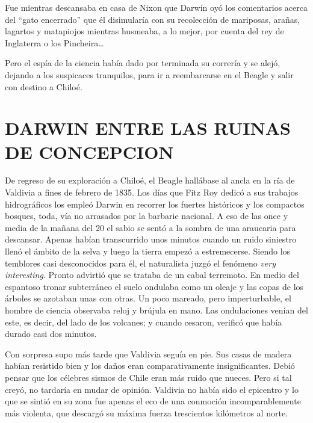 \documentclass[10pt,twoside,openright]{memoir}
\begin{document}
Fue mientras descansaba en casa de Nixon que Darwin oyó los comentarios
acerca del ``gato encerrado'' que él disimularía con su recolección de
mariposas, arañas, lagartos y matapiojos mientras husmeaba, a lo mejor,
por cuenta del rey de Inglaterra o los Pincheira\ldots

Pero el espía de la ciencia había dado por terminada su correría y se
alejó, dejando a los suspicaces tranquilos, para ir a reembarcarse en el
Beagle y salir con destino a Chiloé.

\chapter{DARWIN ENTRE LAS RUINAS DE CONCEPCION}

De regreso de su exploración a Chiloé, el Beagle hallábase al ancla en
la ría de Valdivia a fines de febrero de 1835. Los días que Fitz Roy
dedicó a sus trabajos hidrográficos los empleó Darwin en recorrer los
fuertes históricos y los compactos bosques, toda, vía no arrasados por
la barbarie nacional. A eso de las once y media de la mañana del 20 el
sabio se sentó a la sombra de una araucaria para descansar. Apenas
habían transcurrido unos minutos cuando un ruido siniestro llenó el
ámbito de la selva y luego la tierra empezó a estremecerse. Siendo los
temblores casi desconocidos para él, el naturalista juzgó el fenómeno
\emph{very interesting}. Pronto advirtió que se trataba de un cabal
terremoto. En medio del espantoso tronar subterráneo el suelo ondulaba
como un oleaje y las copas de los árboles se azotaban unas con otras. Un
poco mareado, pero imperturbable, el hombre de ciencia observaba reloj y
brújula en mano. Las ondulaciones venían del este, es decir, del lado de
los volcanes; y cuando cesaron, verificó que había durado casi dos
minutos.

Con sorpresa supo más tarde que Valdivia seguía en pie. Sus casas de
madera habían resistido bien y los daños eran comparativamente
insignificantes. Debió pensar que los célebres sismos de Chile eran más
ruido que nueces. Pero si tal creyó, no tardaría en mudar de opinión.
Valdivia no había sido el epicentro y lo que se sintió en su zona fue
apenas el eco de una conmoción incomparablemente más violenta, que
descargó su máxima fuerza trescientos kilómetros al norte.
\end{document}
